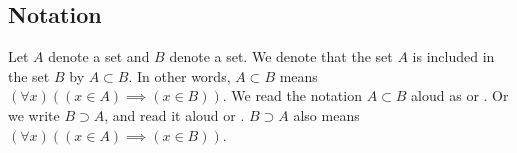 
\subsection*{Notation}

Let $A$ denote a set and $B$ denote a set.
We denote that the set $A$ is included in the set $B$ by $A \subset B$.
In other words, $A \subset B$ means $(\forall x)((x \in A) \implies (x \in B))$.
We read the notation $A \subset B$ aloud as  or .
Or we write $B \supset A$, and read it aloud  or .
$B \supset A$ also means $(\forall x)((x \in A) \implies (x \in B))$.

